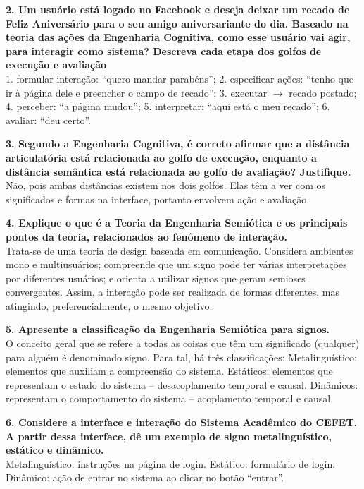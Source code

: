\documentclass[9pt, twocolumn, article]{memoir}
\begin{document}
\textbf{2. Um usuário está logado no Facebook e deseja deixar um recado de Feliz Aniversário para o seu amigo aniversariante do dia.  Baseado na teoria das ações da Engenharia Cognitiva, como esse usuário  vai  agir,  para  interagir  como  sistema?  Descreva  cada  etapa  dos golfos de execução e avaliação}\\
1. formular interação: ``quero mandar parabéns''; 2. especificar ações: ``tenho que ir à página dele e preencher o campo de recado''; 3. executar $\rightarrow$ recado postado; 4. perceber: ``a página mudou''; 5. interpretar: ``aqui está o meu recado''; 6. avaliar: ``deu certo''.

\textbf{3. Segundo   a   Engenharia   Cognitiva,   é   correto  afirmar  que a distância  articulatória  está relacionada ao golfo de execução, enquanto a distância semântica está relacionada ao golfo de avaliação? Justifique.}\\
Não, pois ambas distâncias existem nos dois golfos. Elas têm a ver com os significados e formas na interface, portanto envolvem ação e avaliação.

\textbf{4. Explique  o  que  é  a  Teoria  da  Engenharia  Semiótica  e os  principais  pontos  da  teoria, relacionados ao fenômeno de interação.}\\
Trata-se de uma teoria de design baseada em comunicação. Considera ambientes mono e multiusuários; compreende que um signo pode ter várias interpretações por diferentes usuários; e orienta a utilizar signos que geram semioses convergentes. Assim, a interação pode ser realizada de formas diferentes, mas atingindo, preferencialmente, o mesmo objetivo.

\textbf{5. Apresente a classificação da Engenharia Semiótica para signos.}\\
O conceito geral que se refere a todas as coisas que têm um significado (qualquer) para alguém é denominado signo. Para tal, há três classificações: Metalinguístico: elementos que auxiliam a compreensão do sistema. Estáticos: elementos que representam o estado do sistema -- desacoplamento temporal e causal. Dinâmicos: representam o comportamento do sistema -- acoplamento temporal e causal.

\textbf{6. Considere a interface e interação do Sistema Acadêmico do CEFET. A partir dessa interface, dê um exemplo de signo metalinguístico, estático e dinâmico.}\\
Metalinguístico: instruções na página de login. Estático: formulário de login. Dinâmico: ação de entrar no sistema ao clicar no botão ``entrar''. 
\end{document}
